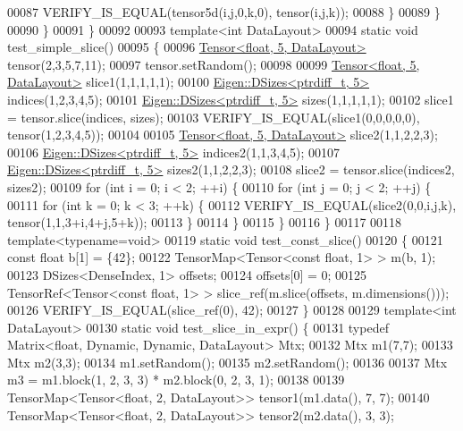 \begin{DoxyCode}
00087         VERIFY\_IS\_EQUAL(tensor5d(i,j,0,k,0), tensor(i,j,k));
00088       \}
00089     \}
00090   \}
00091 \}
00092 
00093 \textcolor{keyword}{template}<\textcolor{keywordtype}{int} DataLayout>
00094 \textcolor{keyword}{static} \textcolor{keywordtype}{void} test\_simple\_slice()
00095 \{
00096   \hyperlink{class_eigen_1_1_tensor}{Tensor<float, 5, DataLayout>} tensor(2,3,5,7,11);
00097   tensor.setRandom();
00098 
00099   \hyperlink{class_eigen_1_1_tensor}{Tensor<float, 5, DataLayout>} slice1(1,1,1,1,1);
00100   \hyperlink{struct_eigen_1_1_d_sizes}{Eigen::DSizes<ptrdiff\_t, 5>} indices(1,2,3,4,5);
00101   \hyperlink{struct_eigen_1_1_d_sizes}{Eigen::DSizes<ptrdiff\_t, 5>} sizes(1,1,1,1,1);
00102   slice1 = tensor.slice(indices, sizes);
00103   VERIFY\_IS\_EQUAL(slice1(0,0,0,0,0), tensor(1,2,3,4,5));
00104 
00105   \hyperlink{class_eigen_1_1_tensor}{Tensor<float, 5, DataLayout>} slice2(1,1,2,2,3);
00106   \hyperlink{struct_eigen_1_1_d_sizes}{Eigen::DSizes<ptrdiff\_t, 5>} indices2(1,1,3,4,5);
00107   \hyperlink{struct_eigen_1_1_d_sizes}{Eigen::DSizes<ptrdiff\_t, 5>} sizes2(1,1,2,2,3);
00108   slice2 = tensor.slice(indices2, sizes2);
00109   \textcolor{keywordflow}{for} (\textcolor{keywordtype}{int} i = 0; i < 2; ++i) \{
00110     \textcolor{keywordflow}{for} (\textcolor{keywordtype}{int} j = 0; j < 2; ++j) \{
00111       \textcolor{keywordflow}{for} (\textcolor{keywordtype}{int} k = 0; k < 3; ++k) \{
00112         VERIFY\_IS\_EQUAL(slice2(0,0,i,j,k), tensor(1,1,3+i,4+j,5+k));
00113       \}
00114     \}
00115   \}
00116 \}
00117 
00118 \textcolor{keyword}{template}<\textcolor{keyword}{typename}=\textcolor{keywordtype}{void}>
00119 \textcolor{keyword}{static} \textcolor{keywordtype}{void} test\_const\_slice()
00120 \{
00121   \textcolor{keyword}{const} \textcolor{keywordtype}{float} b[1] = \{42\};
00122   TensorMap<Tensor<const float, 1> > m(b, 1);
00123   DSizes<DenseIndex, 1> offsets;
00124   offsets[0] = 0;
00125   TensorRef<Tensor<const float, 1> > slice\_ref(m.slice(offsets, m.dimensions()));
00126   VERIFY\_IS\_EQUAL(slice\_ref(0), 42);
00127 \}
00128 
00129 \textcolor{keyword}{template}<\textcolor{keywordtype}{int} DataLayout>
00130 \textcolor{keyword}{static} \textcolor{keywordtype}{void} test\_slice\_in\_expr() \{
00131   \textcolor{keyword}{typedef} Matrix<float, Dynamic, Dynamic, DataLayout> Mtx;
00132   Mtx m1(7,7);
00133   Mtx m2(3,3);
00134   m1.setRandom();
00135   m2.setRandom();
00136 
00137   Mtx m3 = m1.block(1, 2, 3, 3) * m2.block(0, 2, 3, 1);
00138 
00139   TensorMap<Tensor<float, 2, DataLayout>> tensor1(m1.data(), 7, 7);
00140   TensorMap<Tensor<float, 2, DataLayout>> tensor2(m2.data(), 3, 3);

\end{DoxyCode}
